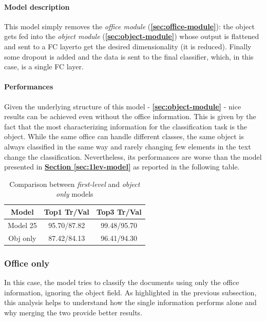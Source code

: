 \documentclass[12pt]{article}
\begin{document}
\paragraph{Model description}
This model simply removes the \textit{office module} (\textbf{\ref{sec:office-module}}): the object gets fed into the \textit{object module} (\textbf{\ref{sec:object-module}}) whose output is flattened and sent to a FC layer to get the desired dimensionality (it is reduced).
Finally some dropout is added and the data is sent to the final classifier, which, in this case, is a single FC layer.
\paragraph{Performances}
Given the underlying structure of this model - \textbf{\ref{sec:object-module}} - nice results can be achieved even without the office information. This is given by the fact that the most characterizing information for the classification task is the object. While the same office can handle different classes, the same object is always classified in the same way and rarely changing few elements in the text change the classification.  Nevertheless, its performances are worse than the model presented in \hyperref[sec:1lev-model]{\textbf{Section \ref{sec:1lev-model}}} as reported in the following table.
\begin{table}[ht!]
    \begin{adjustwidth}{}{}
	    \centering
	    \small
	    \begin{tabular}{ |c|c|c| }
        \hline
        \textbf{Model} & \textbf{Top1 Tr/Val} & \textbf{Top3 Tr/Val}\\
        \hline
        Model 25 & 95.70/87.82 & 99.48/95.70 \\
        Obj only & 87.42/84.13 & 96.41/94.30 \\
        \hline
        \end{tabular}
	    \label{tb:relevant-obj}
    \end{adjustwidth}
    \captionsetup{justification   = centering}
    \caption{Comparison between \textit{first-level} and \textit{object only} models}
\end{table}

\subsubsection{Office only}\label{sec:office_only}
In this case, the model tries to classify the documents using only the office information, ignoring the object field. As highlighted in the previous subsection, this analysis helps to understand how the single information performs alone and why merging the two provide better results.
\end{document}
